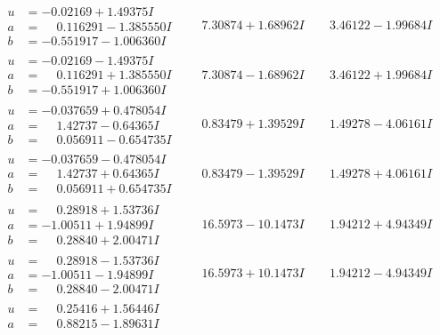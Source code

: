 \documentclass[1p]{elsarticle_modified}
\theoremstyle{definition}
\begin{document}
$$\begin{array}{c|c|c}
\begin{aligned}
u &= -0.02169 + 1.49375 I \\
a &= \phantom{-}0.116291 - 1.385550 I \\
b &= -0.551917 - 1.006360 I\end{aligned}
 & \phantom{-}7.30874 + 1.68962 I & \phantom{-}3.46122 - 1.99684 I \\ \hline\begin{aligned}
u &= -0.02169 - 1.49375 I \\
a &= \phantom{-}0.116291 + 1.385550 I \\
b &= -0.551917 + 1.006360 I\end{aligned}
 & \phantom{-}7.30874 - 1.68962 I & \phantom{-}3.46122 + 1.99684 I \\ \hline\begin{aligned}
u &= -0.037659 + 0.478054 I \\
a &= \phantom{-}1.42737 - 0.64365 I \\
b &= \phantom{-}0.056911 - 0.654735 I\end{aligned}
 & \phantom{-}0.83479 + 1.39529 I & \phantom{-}1.49278 - 4.06161 I \\ \hline\begin{aligned}
u &= -0.037659 - 0.478054 I \\
a &= \phantom{-}1.42737 + 0.64365 I \\
b &= \phantom{-}0.056911 + 0.654735 I\end{aligned}
 & \phantom{-}0.83479 - 1.39529 I & \phantom{-}1.49278 + 4.06161 I \\ \hline\begin{aligned}
u &= \phantom{-}0.28918 + 1.53736 I \\
a &= -1.00511 + 1.94899 I \\
b &= \phantom{-}0.28840 + 2.00471 I\end{aligned}
 & \phantom{-}16.5973 - 10.1473 I & \phantom{-}1.94212 + 4.94349 I \\ \hline\begin{aligned}
u &= \phantom{-}0.28918 - 1.53736 I \\
a &= -1.00511 - 1.94899 I \\
b &= \phantom{-}0.28840 - 2.00471 I\end{aligned}
 & \phantom{-}16.5973 + 10.1473 I & \phantom{-}1.94212 - 4.94349 I \\ \hline\begin{aligned}
u &= \phantom{-}0.25416 + 1.56446 I \\
a &= \phantom{-}0.88215 - 1.89631 I \\

\end{aligned}
\end{array}$$
\end{document}
